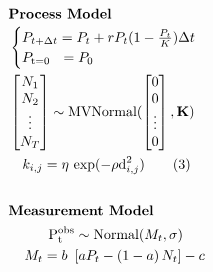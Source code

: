 \documentclass[12pt,preview,border=0]{standalone}
\begin{document}
\begin{align*} 
    \intertext{\centering \textbf{Process Model}}
    &\begin{cases}
        P_{t + \Delta t} = P_t + r P_t (1 - \frac{P_t}{K}) \Delta t \\
        P_\text{t=0}  ~~ = P_0 \\
    \end{cases} 
    \\
    &\begin{bmatrix}
        N_1 \\
        N_2 \\
        \vdots \\
        N_T
    \end{bmatrix} \sim \text{MVNormal}( 
        \begin{bmatrix}
            0 \\
            0 \\
            \vdots \\
            0
        \end{bmatrix}, 
    \textbf{K} ) 
    \\
    & ~~~ k_{i,j} = \eta ~ \text{exp}( -\rho \text{d}^\text{2}_{i,j} ) \label{eq:dgp} \tag{3} \\
    \\
    \intertext{\centering \textbf{Measurement Model}}
    & \hphantom{xxxxx} \mathrm{ P_{t}^{obs} }  \sim \text{Normal}( M_t, \sigma )  \\
    & \hphantom{xx} M_t                     =  b ~ \left[ a P_t - \left( 1 - a \right) N_t \right] - c 
\end{align*}
\\
\end{document}
